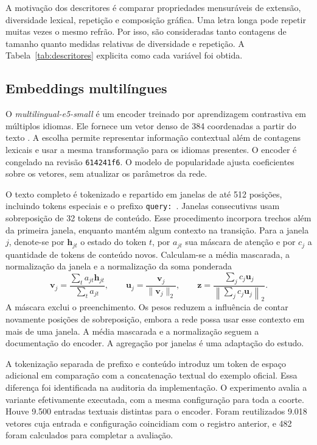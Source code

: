 A motivação dos descritores é comparar propriedades mensuráveis de extensão, diversidade lexical, repetição e composição gráfica. Uma letra longa pode repetir muitas vezes o mesmo refrão. Por isso, são consideradas tanto contagens de tamanho quanto medidas relativas de diversidade e repetição. A Tabela~\ref{tab:descritores} explicita como cada variável foi obtida.



\subsection{Embeddings multilíngues}
O \textit{multilingual-e5-small} é um encoder treinado por aprendizagem contrastiva em múltiplos idiomas. Ele fornece um vetor denso de 384 coordenadas a partir do texto \cite{wang2024,e5card}. A escolha permite representar informação contextual além de contagens lexicais e usar a mesma transformação para os idiomas presentes. O encoder é congelado na revisão \texttt{614241f6}. O modelo de popularidade ajusta coeficientes sobre os vetores, sem atualizar os parâmetros da rede.

O texto completo é tokenizado e repartido em janelas de até 512 posições, incluindo tokens especiais e o prefixo \texttt{query: }. Janelas consecutivas usam sobreposição de 32 tokens de conteúdo. Esse procedimento incorpora trechos além da primeira janela, enquanto mantém algum contexto na transição. Para a janela $j$, denote-se por $\bm h_{jt}$ o estado do token $t$, por $a_{jt}$ sua máscara de atenção e por $c_j$ a quantidade de tokens de conteúdo novos. Calculam-se a média mascarada, a normalização da janela e a normalização da soma ponderada
\begin{equation}
\bm v_j=\frac{\sum_t a_{jt}\bm h_{jt}}{\sum_t a_{jt}},\qquad
\bm u_j=\frac{\bm v_j}{\|\bm v_j\|_2},\qquad
\bm z=\frac{\sum_j c_j\bm u_j}{\left\|\sum_j c_j\bm u_j\right\|_2}.
\end{equation}
A máscara exclui o preenchimento. Os pesos reduzem a influência de contar novamente posições de sobreposição, embora a rede possa usar esse contexto em mais de uma janela. A média mascarada e a normalização seguem a documentação do encoder. A agregação por janelas é uma adaptação do estudo.

A tokenização separada de prefixo e conteúdo introduz um token de espaço adicional em comparação com a concatenação textual do exemplo oficial. Essa diferença foi identificada na auditoria da implementação. O experimento avalia a variante efetivamente executada, com a mesma configuração para toda a coorte. Houve 9.500 entradas textuais distintas para o encoder. Foram reutilizados 9.018 vetores cuja entrada e configuração coincidiam com o registro anterior, e 482 foram calculados para completar a avaliação.

